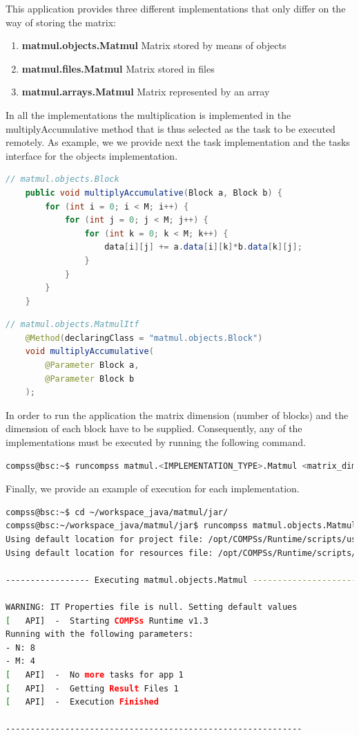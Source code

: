 This application provides three different implementations that only differ on the way of storing the matrix:
\begin{enumerate}
 \item \textbf{matmul.objects.Matmul} Matrix stored by means of objects
 \item \textbf{matmul.files.Matmul} Matrix stored in files
 \item \textbf{matmul.arrays.Matmul} Matrix represented by an array
\end{enumerate}

In all the implementations the multiplication is implemented in the multiplyAccumulative method that is thus selected as the task to be executed remotely.
As example, we we provide next the task implementation and the tasks interface for the objects implementation.

\begin{lstlisting}[language=java]
	// matmul.objects.Block
	public void multiplyAccumulative(Block a, Block b) {
		for (int i = 0; i < M; i++) {
			for (int j = 0; j < M; j++) {
				for (int k = 0; k < M; k++) {
					data[i][j] += a.data[i][k]*b.data[k][j];
				}
			}
		}
	}
\end{lstlisting}

\begin{lstlisting}[language=java]
	// matmul.objects.MatmulItf
	@Method(declaringClass = "matmul.objects.Block")
	void multiplyAccumulative(
		@Parameter Block a,
		@Parameter Block b
	);
\end{lstlisting}

In order to run the application the matrix dimension (number of blocks) and the dimension of each block have to be supplied. Consequently, any of the 
implementations must be executed by running the following command.
\begin{lstlisting}[language=bash]
compss@bsc:~$ runcompss matmul.<IMPLEMENTATION_TYPE>.Matmul <matrix_dim> <block_dim>
\end{lstlisting}

Finally, we provide an example of execution for each implementation.

\begin{lstlisting}[language=bash]
compss@bsc:~$ cd ~/workspace_java/matmul/jar/
compss@bsc:~/workspace_java/matmul/jar$ runcompss matmul.objects.Matmul 8 4
Using default location for project file: /opt/COMPSs/Runtime/scripts/user/../../configuration/xml/projects/project.xml
Using default location for resources file: /opt/COMPSs/Runtime/scripts/user/../../configuration/xml/resources/resources.xml

----------------- Executing matmul.objects.Matmul --------------------------

WARNING: IT Properties file is null. Setting default values
[   API]  -  Starting COMPSs Runtime v1.3
Running with the following parameters:
- N: 8
- M: 4
[   API]  -  No more tasks for app 1
[   API]  -  Getting Result Files 1
[   API]  -  Execution Finished

------------------------------------------------------------
\end{lstlisting}

